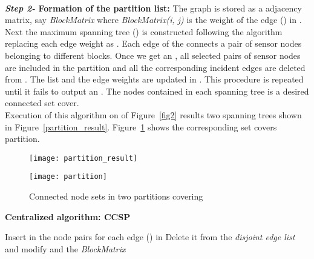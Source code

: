\documentclass{acm_proc_article-sp}
\begin{document}
 \\{\bf {\it Step 2-} Formation of the partition list:} The graph  is stored as a  adjacency matrix, say {\it BlockMatrix} where {\it BlockMatrix(i, j)} is the weight of the edge () in . Next the maximum spanning tree () is constructed following the  algorithm replacing each edge weight  as . Each edge of the  connects a pair of sensor nodes belonging to different blocks. Once we get an , all selected pairs of sensor nodes are included in the partition and all the corresponding incident edges are deleted from . The  list and the edge weights are updated in . This procedure is repeated until it fails to output an . The nodes contained in each spanning tree is a desired connected set cover.\\
 Execution of this algorithm on  of Figure~\ref{fig2} results two spanning trees shown in Figure~\ref{partition_result}. Figure~\ref{active_partition} shows the corresponding set covers partition.
  \begin{figure}[ht!]
\begin{minipage}[b]{0.5\linewidth}
		  \centering
		 \texttt{[image: partition\_result]}
	    \caption{\scriptsize{Two MST's from  of Figure \ref{fig4}}}
	     \label{partition_result}
	      \end{minipage}
	      \hspace{0.5cm}
	      \begin{minipage}[b]{0.4\linewidth}
		  \centering
		   \texttt{[image: partition]}
	    \caption{\scriptsize{Connected node sets in two partitions covering }}
	    \label{active_partition}
		\end{minipage}
		\end{figure}
		
	\vspace{-0.2cm}
{\bf  Centralized algorithm: CCSP }
   \begin{algorithm}[ht]
         \scriptsize
        \SetLine
\caption{\scriptsize{Centralized algorithm: CCSP}}
	\;
        {
	  \;
               Insert in  the node pairs for each edge () in \;
	       Delete it from the {\it disjoint edge list} and modify  and the {\it BlockMatrix} \;
	      }
  \normalsize
  \end{algorithm}
  \vspace{-0.6cm}
\end{document}
